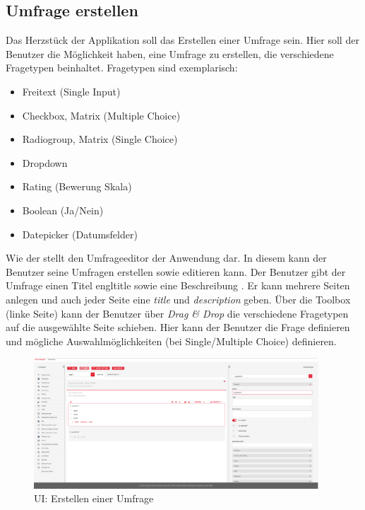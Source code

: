 
\subsection{Umfrage erstellen}
\label{ssec:UmfrageErstellen}

Das Herzstück der Applikation soll das Erstellen einer Umfrage sein. 
Hier soll der Benutzer die Möglichkeit haben, eine Umfrage zu erstellen, die verschiedene Fragetypen beinhaltet. 
Fragetypen sind exemplarisch: 
%
\begin{itemize}
	\item Freitext (Single Input)
	\item Checkbox, Matrix (Multiple Choice)
	\item Radiogroup, Matrix (Single Choice)
	\item Dropdown 
	\item Rating (Bewerung Skala)
	\item Boolean (Ja/Nein)
	\item Datepicker (Datumsfelder)
\end{itemize}
%

Wie der \abb {} stellt den Umfrageeditor der Anwendung dar. In diesem kann der Benutzer seine Umfragen erstellen sowie editieren kann. 
Der Benutzer gibt der Umfrage einen Titel engl{title} sowie eine Beschreibung . 
Er kann mehrere Seiten anlegen und auch jeder Seite eine \emph{title} und \emph{description} geben. \newline
Über die Toolbox (linke Seite) kann der Benutzer über \emph{Drag \& Drop} die verschiedene Fragetypen auf die ausgewählte Seite schieben.  
Hier kann der Benutzer die Frage definieren und mögliche Auswahlmöglichkeiten (bei Single/Multiple Choice) definieren. 

\begin{figure}[!htb]
	\centering
	\includegraphics[width=0.95\textwidth, keepaspectratio]{img/client/CreateSurveyMaster.png}
	\captionsetup{justification=centering, format=plain}
	\caption[\acf{UI}: Erstellen einer Umfrage]{\acf{UI}: Erstellen einer Umfrage \\ \quelleScreenshot}
	\label{fig:SurveyCreatorImplement}
\end{figure}

